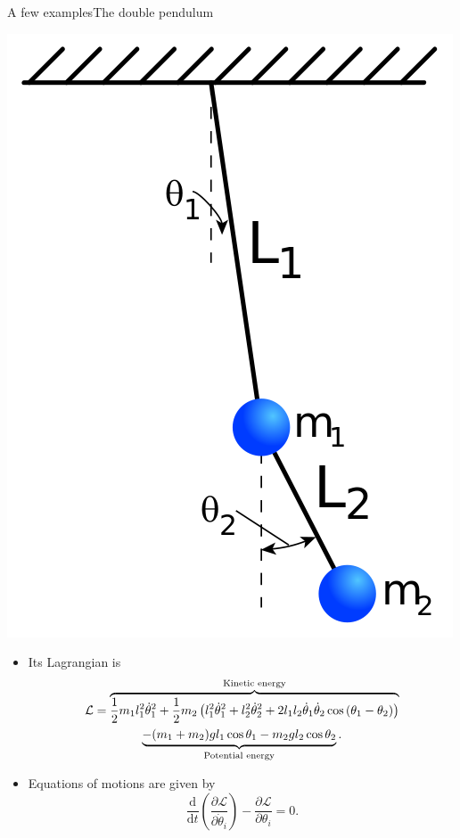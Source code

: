 \documentclass[usenames,dvipsnames,svgnames,10pt,aspectratio=169]{beamer}
\begin{document}
\begin{frame}[t, c]{A few examples}{The double pendulum}
	\begin{minipage}{.28\textwidth}
		\centering
		\includegraphics[width=.9\textwidth]{double_pendulum_geometry}
	\end{minipage}%
	\hfill
	\begin{minipage}{.68\textwidth}
		\begin{itemize}
			\item Its Lagrangian is
			\begin{multline}
				\mathcal{L} = \overbrace{\frac{1}{2} m_1 l_1^2 \dot{\theta}_1^2 + \frac{1}{2} m_2 \left( l_1^2 \dot{\theta}_1^2 + l_2^2 \dot{\theta}_2^2 + 2 l_1 l_2 \dot{\theta}_1 \dot{\theta}_2 \cos \left( \theta_1 - \theta_2 \right) \right)}^{\textrm{Kinetic energy}} \\
				\underbrace{- (m_1 + m_2) g l_1 \cos \theta_1 - m_2 g l_2 \cos \theta_2}_{\textrm{Potential energy}}.
				\notag
			\end{multline}

			\item Equations of motions are given by
			\[
				\frac{\mathrm{d}}{\mathrm{d}t} \left(	\frac{\partial \mathcal{L}}{\partial \dot{\theta}_i} \right) - \frac{\partial \mathcal{L}}{\partial \theta_i} = 0.
			\]


\end{itemize}
\end{minipage}
\end{frame}
\end{document}
